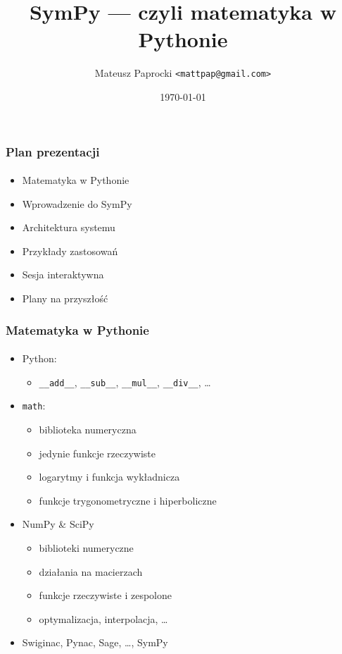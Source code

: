 \documentclass[10pt]{beamer}
\title{SymPy --- czyli matematyka w Pythonie}
\author{Mateusz Paprocki \texttt{<mattpap@gmail.com>}}
\institute{Wrocław University of Technology \\ University of Nevada, Reno}
\date{\today}
\begin{document}
\begin{frame}[plain,t]
    \maketitle
\end{frame}

\begin{frame}
    \frametitle{Plan prezentacji}
    \framesubtitle{}

    \begin{itemize}
        \item Matematyka w Pythonie
        \item Wprowadzenie do SymPy
        \item Architektura systemu
        \item Przykłady zastosowań
        \item Sesja interaktywna
        \item Plany na przyszłość
    \end{itemize}
\end{frame}

\begin{frame}[fragile]
    \frametitle{Matematyka w Pythonie}
    \framesubtitle{}

    \begin{itemize}
        \item Python:
            \begin{itemize}
                \item \verb+__add__+, \verb+__sub__+, \verb+__mul__+, \verb+__div__+, \ldots
            \end{itemize}
        \pause
        \item \texttt{math}:
            \begin{itemize}
                \item biblioteka numeryczna
                \item jedynie funkcje rzeczywiste
                \item logarytmy i funkcja wykładnicza
                \item funkcje trygonometryczne i hiperboliczne
            \end{itemize}
        \pause
        \item NumPy \& SciPy
            \begin{itemize}
                \item biblioteki numeryczne
                \item działania na macierzach
                \item funkcje rzeczywiste i zespolone
                \item optymalizacja, interpolacja, \ldots
            \end{itemize}
        \pause
        \item Swiginac, Pynac, Sage, \ldots, SymPy
    \end{itemize}
\end{frame}
\end{document}
